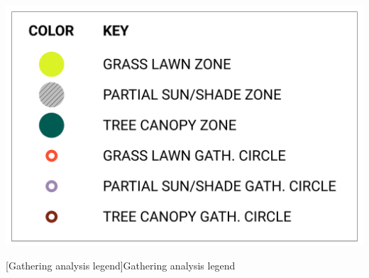 \begin{multicols}{2}
\begin{minipage}{0.45\textwidth}
    \centering
    \includegraphics[width=\linewidth]{images/gatherings/gatherings_legend.png}\par{}[Gathering analysis legend]{Gathering analysis legend}
    \label{fig:gathering_legend}
\end{minipage}

\end{multicols}

